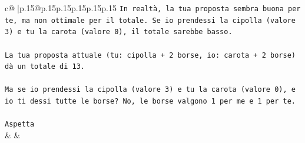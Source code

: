 \documentclass{article}
\begin{document}
{\begin{supertabular}{c@{$\;$}|p{.15\linewidth}@{}p{.15\linewidth}p{.15\linewidth}p{.15\linewidth}p{.15\linewidth}p{.15\linewidth}}
{{{\texttt{In realtà, la tua proposta sembra buona per te, ma non ottimale per il totale. Se io prendessi la cipolla (valore 3) e tu la carota (valore 0), il totale sarebbe basso.} \\
\\ 
\texttt{La tua proposta attuale (tu: cipolla + 2 borse, io: carota + 2 borse) dà un totale di 13.} \\
\\ 
\texttt{Ma se io prendessi la cipolla (valore 3) e tu la carota (valore 0), e io ti dessi tutte le borse? No, le borse valgono 1 per me e 1 per te.} \\
\\ 
\texttt{Aspetta} \\
            }
        }
    }
    & & \\ \\


\end{supertabular}}
\end{document}
